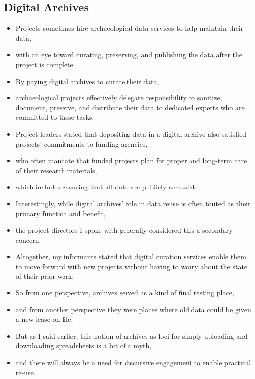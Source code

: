 \documentclass{article}
\begin{document}
\subsection{Digital Archives}
\begin{itemize}
  \item Projects sometimes hire archaeological data services to help maintain their data,
  \item with an eye toward curating, preserving, and publishing the data after the project is complete.\\

  \item By paying digital archives to curate their data,
  \item archaeological projects effectively delegate responsibility to sanitize, document, preserve, and distribute their data to dedicated experts who are committed to these tasks.\\

  \item Project leaders stated that depositing data in a digital archive also satisfied projects’ commitments to funding agencies,
  \item who often mandate that funded projects plan for proper and long-term care of their research materials,
  \item which includes ensuring that all data are publicly accessible.\\

  \item Interestingly, while digital archives’ role in data reuse is often touted as their primary function and benefit,
  \item the project directors I spoke with generally considered this a secondary concern.\\

  \item Altogether, my informants stated that digital curation services enable them to move forward with new projects without having to worry about the state of their prior work.

  \item So from one perspective, archives served as a kind of final resting place,
  \item and from another perspective they were places where old data could be given a new lease on life.\\

  \item But as I said earlier, this notion of archives as loci for simply uploading and downloading spreadsheets is a bit of a myth,
  \item and there will always be a need for discursive engagement to enable practical re-use.\\


\end{itemize}
\end{document}
